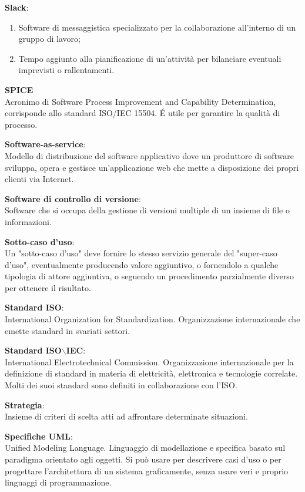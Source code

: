 \documentclass[a4paper, oneside, openany, dvipsnames, table]{article}
\begin{document}
\textbf{Slack}:
\begin{enumerate}
	\item Software di messaggistica specializzato per la collaborazione all'interno di un gruppo di lavoro;
	\item Tempo aggiunto alla pianificazione di un'attività per bilanciare eventuali imprevisti o rallentamenti.
\end{enumerate} 

\textbf{SPICE}\\
Acronimo di Software Process Improvement and Capability Determination, corrisponde allo standard ISO/IEC 15504. \'E utile per garantire la qualità di processo.

\textbf{Software-as-service}:\\	Modello di distribuzione del software applicativo dove un produttore di software sviluppa, opera e gestisce un'applicazione web che mette a disposizione dei propri clienti via Internet.

\textbf{Software di controllo di versione}:\\ Software che si occupa della  gestione di versioni multiple di un insieme di file o informazioni.

\textbf{Sotto-caso d'uso}:\\
Un "sotto-caso d'uso" deve fornire lo stesso servizio generale del "super-caso d'uso", eventualmente producendo valore aggiuntivo, o fornendolo a qualche tipologia di attore aggiuntiva, o seguendo un procedimento parzialmente diverso per ottenere il risultato.

\textbf{Standard ISO}:\\	International Organization for Standardization. Organizzazione internazionale che emette standard in svariati settori.

\textbf{Standard ISO$\backslash$IEC}:\\	International Electrotechnical Commission. Organizzazione internazionale per la definizione di standard in materia di elettricità, elettronica e tecnologie correlate. Molti dei suoi standard sono definiti in collaborazione con l'ISO.

\textbf{Strategia}:\\Insieme di criteri di scelta atti ad affrontare determinate situazioni.

\textbf{Specifiche UML}:\\	Unified Modeling Language. Linguaggio di modellazione e specifica basato sul paradigma orientato agli oggetti. Si può usare per descrivere casi d'uso o per progettare l'architettura di un sistema graficamente, senza usare veri e proprio linguaggi di programmazione.
\end{document}
